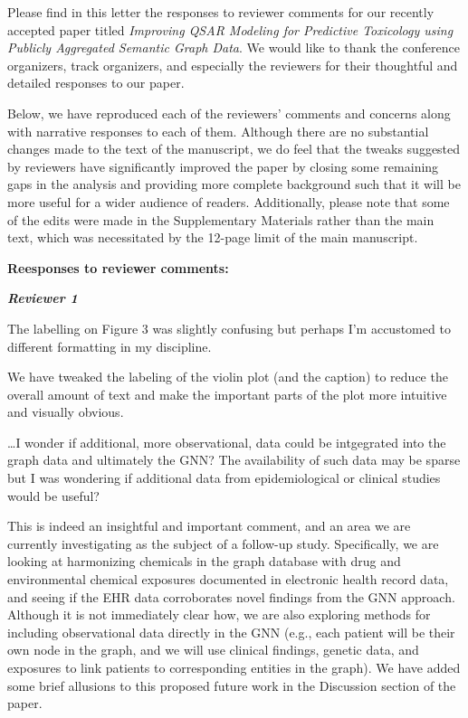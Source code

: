 \documentclass{ibilttr}
\begin{document}
Please find in this letter the responses to reviewer comments for our
recently accepted paper titled \textit{Improving QSAR Modeling for
Predictive Toxicology using Publicly Aggregated Semantic Graph
Data}. We would like to thank the conference organizers, track
organizers, and especially the reviewers for their thoughtful and
detailed responses to our paper.

Below, we have reproduced each of the reviewers' comments and
concerns along with narrative responses to each of them. Although
there are no substantial changes made to the text of the manuscript,
we do feel that the tweaks suggested by reviewers have significantly
improved the paper by closing some remaining gaps in the analysis and
providing more complete background such that it will be more useful
for a wider audience of readers. Additionally, please note that some
of the edits were made in the Supplementary Materials rather than the
main text, which was necessitated by the 12-page limit of the main
manuscript.

\textbf{\sffamily Reesponses to reviewer comments:}

\textit{\textbf{Reviewer 1}}

\vspace{-1em}
\begin{displayquote}
The labelling on Figure 3 was slightly confusing but perhaps I'm
accustomed to different formatting in my discipline.
\end{displayquote}

We have tweaked the labeling of the violin plot (and the caption) to reduce
the overall amount of text and make the important parts of the plot
more intuitive and visually obvious.

\begin{displayquote}
\ldots I wonder if additional, more observational, data could be
intgegrated into the graph data and ultimately the GNN? The
availability of such data may be sparse but I was wondering if
additional data from epidemiological or clinical studies would be
useful?
\end{displayquote}

This is indeed an insightful and important comment, and an area we are
currently investigating as the subject of a follow-up
study. Specifically, we are looking at harmonizing chemicals in the
graph database with drug and environmental chemical exposures
documented in electronic health record data, and seeing if the EHR
data corroborates novel findings from the GNN approach. Although it is
not immediately clear how, we are also exploring methods for including
observational data directly in the GNN (e.g., each patient will be
their own node in the graph, and we will use clinical findings,
genetic data, and exposures to link patients to corresponding entities
in the graph). We have added some brief allusions to this proposed
future work in the Discussion section of the paper.
\end{document}
